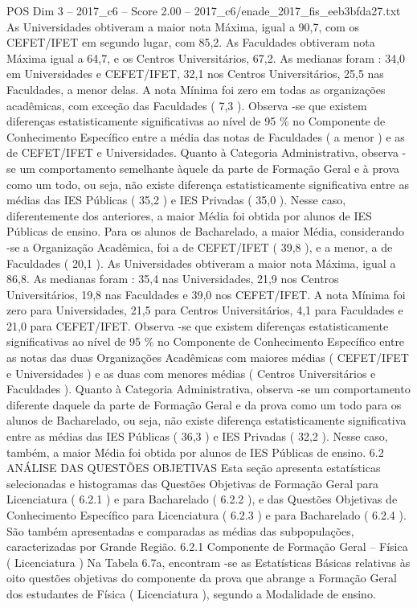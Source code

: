 \begin{textsample}{POS Dim 3 – 2017\_c6 – Score 2.00 – 2017\_c6/enade\_2017\_fis\_eeb3bfda27.txt}
As Universidades obtiveram a maior nota Máxima, igual a 90,7, com os CEFET/IFET em segundo lugar, com 85,2.
As Faculdades obtiveram nota Máxima igual a 64,7, e os Centros Universitários, 67,2.
As medianas foram : 34,0 em Universidades e CEFET/IFET, 32,1 nos Centros Universitários, 25,5 nas Faculdades, a menor delas.
A nota Mínima foi zero em todas as organizações acadêmicas, com exceção das Faculdades ( 7,3 ).
Observa -se que existem diferenças estatisticamente significativas ao nível de 95 \% no Componente de Conhecimento Específico entre a média das notas de Faculdades ( a menor ) e as de CEFET/IFET e Universidades.
Quanto à Categoria Administrativa, observa -se um comportamento semelhante àquele da parte de Formação Geral e à prova como um todo, ou seja, não existe diferença estatisticamente significativa entre as médias das IES Públicas ( 35,2 ) e IES Privadas ( 35,0 ).
Nesse caso, diferentemente dos anteriores, a maior Média foi obtida por alunos de IES Públicas de ensino.
Para os alunos de Bacharelado, a maior Média, considerando -se a Organização Acadêmica, foi a de CEFET/IFET ( 39,8 ), e a menor, a de Faculdades ( 20,1 ).
As Universidades obtiveram a maior nota Máxima, igual a 86,8.
As medianas foram : 35,4 nas Universidades, 21,9 nos Centros Universitários, 19,8 nas Faculdades e 39,0 nos CEFET/IFET.
A nota Mínima foi zero para Universidades, 21,5 para Centros Universitários, 4,1 para Faculdades e 21,0 para CEFET/IFET.
Observa -se que existem diferenças estatisticamente significativas ao nível de 95 \% no Componente de Conhecimento Específico entre as notas das duas Organizações Acadêmicas com maiores médias ( CEFET/IFET e Universidades ) e as duas com menores médias ( Centros Universitários e Faculdades ).
Quanto à Categoria Administrativa, observa -se um comportamento diferente daquele da parte de Formação Geral e da prova como um todo para os alunos de Bacharelado, ou seja, não existe diferença estatisticamente significativa entre as médias das IES Públicas ( 36,3 ) e IES Privadas ( 32,2 ).
Nesse caso, também, a maior Média foi obtida por alunos de IES Públicas de ensino. 6.2 ANÁLISE DAS QUESTÕES OBJETIVAS Esta seção apresenta estatísticas selecionadas e histogramas das Questões Objetivas de Formação Geral para Licenciatura ( 6.2.1 ) e para Bacharelado ( 6.2.2 ), e das Questões Objetivas de Conhecimento Específico para Licenciatura ( 6.2.3 ) e para Bacharelado ( 6.2.4 ).
São também apresentadas e comparadas as médias das subpopulações, caracterizadas por Grande Região. 6.2.1 Componente de Formação Geral – Física ( Licenciatura ) Na Tabela 6.7a, encontram -se as Estatísticas Básicas relativas às oito questões objetivas do componente da prova que abrange a Formação Geral dos estudantes de Física ( Licenciatura ), segundo a Modalidade de ensino.

\end{textsample}
